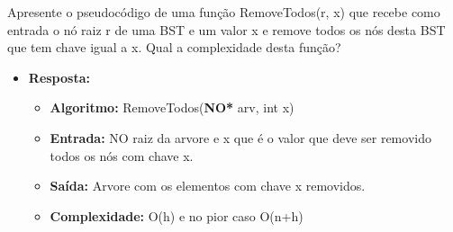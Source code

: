 Apresente o pseudocódigo de uma função 
RemoveTodos(r, x) que recebe como entrada o nó
raiz r de uma BST e um valor x e remove todos os nós desta BST que tem chave igual a x.
Qual a complexidade desta função?

\begin{itemize}
	\item \textbf{Resposta:}
	
	\begin{itemize}
		\item \textbf{Algoritmo:} RemoveTodos(\textbf{NO*} arv, int x)
		\item \textbf{Entrada:} NO raiz da arvore e x que é o valor que deve ser removido todos os nós com chave x.
		\item \textbf{Saída:}
		Arvore com os elementos com chave x removidos.
		\item \textbf{Complexidade:} O(h) e no pior caso O(n+h)
		

\end{itemize}
\end{itemize}
